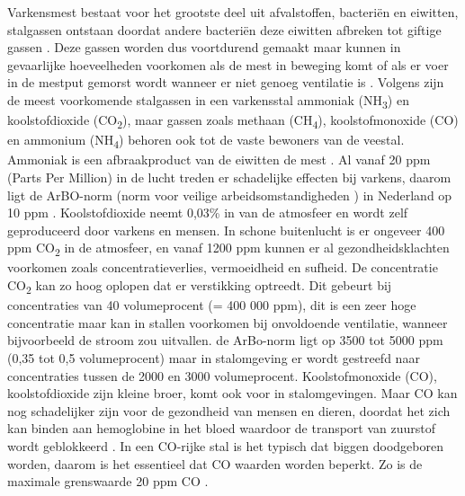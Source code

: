Varkensmest bestaat voor het grootste deel uit afvalstoffen, bacteriën en eiwitten, stalgassen ontstaan doordat andere bacteriën deze eiwitten afbreken tot giftige gassen \autocite{Wolf2013}. Deze gassen worden dus voortdurend gemaakt maar kunnen in gevaarlijke hoeveelheden voorkomen als de mest in beweging komt of als er voer in de mestput gemorst wordt \autocite{Wolf2013} wanneer er niet genoeg ventilatie is
. Volgens \textcite{Klooster1993} zijn de meest voorkomende stalgassen in een varkensstal ammoniak (NH\textsubscript{3}) en koolstofdioxide (CO\textsubscript{2}), maar gassen zoals methaan (CH\textsubscript{4}), koolstofmonoxide (CO) en ammonium (NH\textsubscript{4}) behoren ook tot de vaste bewoners van de veestal. Ammoniak is een afbraakproduct van de eiwitten de mest \autocite{Wolf2013}. Al vanaf 20 ppm (Parts Per Million) in de lucht treden er schadelijke effecten bij varkens, daarom ligt de ArBO-norm (norm voor veilige arbeidsomstandigheden
) in Nederland op 10 ppm
. Koolstofdioxide neemt 0,03\% in van de atmosfeer
en wordt zelf geproduceerd door varkens en mensen. In schone buitenlucht is er ongeveer 400 ppm CO\textsubscript{2} in de atmosfeer, en vanaf 1200 ppm kunnen er al gezondheidsklachten voorkomen zoals concentratieverlies, vermoeidheid en sufheid.
De concentratie CO\textsubscript{2} kan zo hoog oplopen dat er verstikking optreedt. Dit gebeurt bij concentraties van 40 volumeprocent (= 400 000 ppm), dit is een zeer hoge concentratie maar kan in stallen voorkomen bij onvoldoende ventilatie, wanneer bijvoorbeeld de stroom zou uitvallen. de ArBo-norm ligt op 3500 tot 5000 ppm (0,35 tot 0,5 volumeprocent) maar in stalomgeving er wordt gestreefd naar concentraties tussen de 2000 en 3000 volumeprocent.
Koolstofmonoxide (CO), koolstofdioxide zijn kleine broer, komt ook voor in stalomgevingen. Maar CO kan nog schadelijker zijn voor de gezondheid van mensen en dieren, doordat het zich kan binden aan hemoglobine in het bloed waardoor de transport van zuurstof wordt geblokkeerd \autocite{Wolf2013}. In een CO-rijke stal is het typisch dat biggen doodgeboren worden, daarom is het essentieel dat CO waarden worden beperkt. Zo is de maximale grenswaarde 20 ppm CO .




